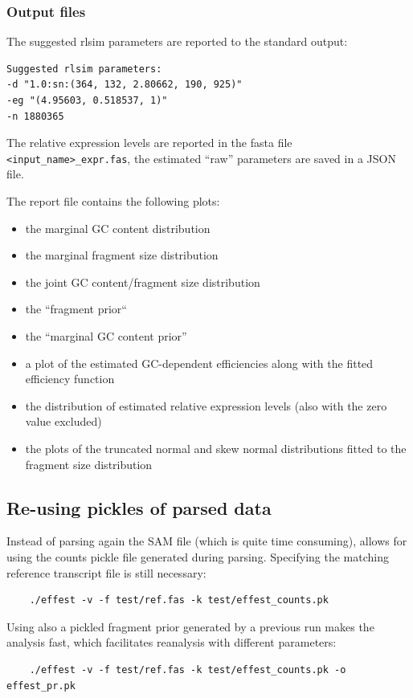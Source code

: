 \subsubsection{Output files}

\begin{itemize}
    \item{The suggested rlsim parameters are reported to the standard output:
        \begin{verbatim}
Suggested rlsim parameters:
-d "1.0:sn:(364, 132, 2.80662, 190, 925)"
-eg "(4.95603, 0.518537, 1)"
-n 1880365
        \end{verbatim}
    \item{The relative expression levels are reported in the fasta file \texttt{<input\_name>\_expr.fas}, the estimated ``raw'' parameters are saved in a JSON file.}
    \item{The report file contains the following plots:
        \begin{itemize}
            \item the marginal GC content distribution
            \item the marginal fragment size distribution
            \item the joint GC content/fragment size distribution
            \item the ``fragment prior``
            \item the ``marginal GC content prior''
            \item a plot of the estimated GC-dependent efficiencies along with the fitted efficiency function
            \item the distribution of estimated relative expression levels (also with the zero value excluded)
            \item the plots of the truncated normal and skew normal distributions fitted to the fragment size distribution
        \end{itemize}
    }
    }

\end{itemize}
\subsection{Re-using pickles of parsed data}
\label{sec:pickle}

Instead of parsing again the SAM file (which is quite time consuming), \effest allows for using the counts pickle file generated during parsing. Specifying the matching reference transcript file is still necessary:
\begin{verbatim}
    ./effest -v -f test/ref.fas -k test/effest_counts.pk
\end{verbatim}

Using also a pickled fragment prior generated by a previous run makes the analysis fast, which facilitates reanalysis with different parameters:
\begin{verbatim}
    ./effest -v -f test/ref.fas -k test/effest_counts.pk -o effest_pr.pk
\end{verbatim}


